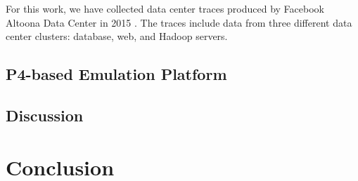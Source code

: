 For this work, we have collected data center traces produced by Facebook Altoona Data Center in 2015 \cite{Roy:15}. The traces include data from three different data center clusters: database, web, and Hadoop servers.

\subsection{P4-based Emulation Platform}\label{sec:emulation}


\subsection{Discussion}\label{sec:results:discussion}


\section{Conclusion}\label{sec:conclusion}



